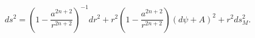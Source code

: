 \begin{equation}
ds^{2}=\left(1-\frac{a^{2n+2}}{r^{2n+2}}\right)^{-1}dr^{2}+
r^{2}\left(1-\frac{a^{2n+2}}{r^{2n+2}}\right)(d\psi+A)^{2}
+r^{2}ds_{M}^{2}. \label{Egu}
\end{equation}

